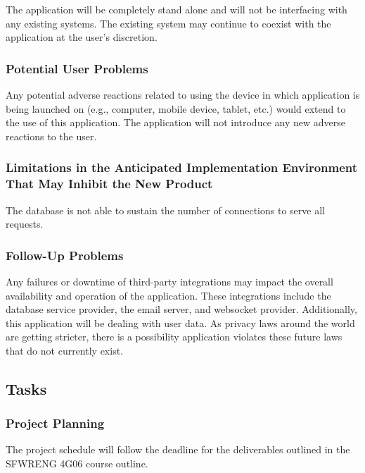 \documentclass[12pt]{article}
\begin{document}
The application will be completely stand alone and will not be interfacing with any existing
systems. The existing system may continue to coexist with the application at the user's discretion.

\subsubsection{Potential User Problems}

Any potential adverse reactions related to using the device in which application is being launched
on (e.g., computer, mobile device, tablet, etc.) would extend to the use of this application. The
application will not introduce any new adverse reactions to the user.

\subsubsection{Limitations in the Anticipated Implementation Environment That May Inhibit the New Product}

The database is not able to sustain the number of connections to serve all requests.

\subsubsection{Follow-Up Problems}

Any failures or downtime of third-party integrations may impact the overall availability and
operation of the application. These integrations include the database service provider, the email
server, and websocket provider. Additionally, this application will be dealing with user data. As
privacy laws around the world are getting stricter, there is a possibility application violates
these future laws that do not currently exist.

\subsection{Tasks}
\subsubsection{Project Planning}
The project schedule will follow the deadline for the deliverables outlined in the SFWRENG 4G06
course outline.
\end{document}
